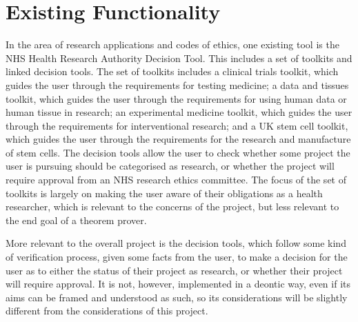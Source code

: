 \documentclass{l4proj}
\begin{document}


\section{Existing Functionality}
In the area of research applications and codes of ethics, one existing tool is the NHS Health Research Authority Decision Tool\cite{NHS}. This includes a set of toolkits and linked decision tools. The set of toolkits includes a clinical trials toolkit, which guides the user through the requirements for testing medicine; a data and tissues toolkit, which guides the user through  the requirements for using human data or human tissue in research; an experimental medicine toolkit, which guides the user through the requirements for interventional research; and a UK stem cell toolkit, which guides the user through the requirements for the research and manufacture of stem cells. The decision tools allow the user to check whether some project the user is pursuing should be categorised as research, or whether the project will require approval from an NHS research ethics committee. The focus of the set of toolkits is largely on making the user aware of their obligations as a health researcher, which is relevant to the concerns of the project, but less relevant to the end goal of a theorem prover. 

More relevant to the overall project is the decision tools, which follow some kind of verification process, given some facts from the user, to make a decision for the user as to either the status of their project as research, or whether their project will require approval. It is not, however, implemented in a deontic way, even if its aims can be framed and understood as such, so its considerations will be slightly different from the considerations of this project. 
\end{document}

